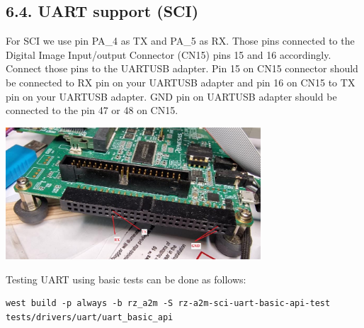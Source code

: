 \documentclass[11pt,a4paper,oneside]{article}
\begin{document}
\subsection*{6.4. UART support (SCI)}\label{uart-sci-support}

For SCI we use pin PA\_4 as TX and PA\_5 as RX. Those pins connected to the
Digital Image Input/output Connector (CN15) pins 15 and 16 accordingly.
Connect those pins to the UART\-USB adapter. Pin 15 on CN15 connector should be connected to RX pin
on your UART\-USB adapter and pin 16 on CN15 to TX pin on your UART\-USB adapter. GND pin on UART\-USB adapter
should be connected to the pin 47 or 48 on CN15.

\includegraphics[width=3.75in,height=1.94in]{./media/SCI0_1.jpg}

Testing UART using basic tests can be done as follows:

\begin{lstlisting}
west build -p always -b rz_a2m -S rz-a2m-sci-uart-basic-api-test tests/drivers/uart/uart_basic_api
\end{lstlisting}
\end{document}
